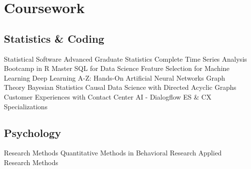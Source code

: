 \documentclass[letterpaper]{deedy-resume_sm} %
\begin{document}
\section{Coursework}
\subsection{Statistics \& Coding}
Statistical Software \textbullet{} 
Advanced Graduate Statistics %
\textbullet{} Complete Time Series Analysis Bootcamp in R \textbullet{} Master SQL for Data Science \textbullet{} Feature Selection for Machine Learning \textbullet{} Deep Learning A-Z: Hands-On Artificial Neural Networks \textbullet{} Graph Theory \textbullet{} Bayesian Statistics \textbullet{} Causal Data Science with Directed Acyclic Graphs \textbullet{} Customer Experiences with Contact Center AI - Dialogflow ES \& CX Specializations %
\subsection{Psychology}
Research Methods \textbullet{} 
Quantitative Methods in Behavioral Research \textbullet{} 
Applied Research Methods %
\end{document}

